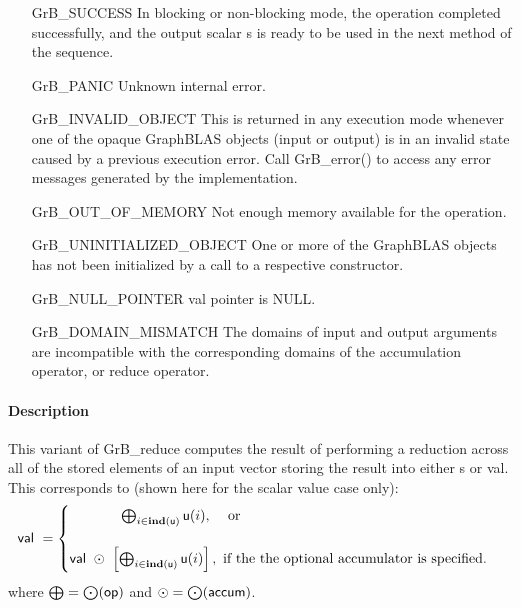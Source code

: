 \begin{itemize}[leftmargin=2.1in]
    \item[{\sf GrB\_SUCCESS}]         In blocking or non-blocking mode, 
    the operation completed successfully, and the
    output scalar {\sf s} is ready to be used in the next method of 
    the sequence.

    \item[{\sf GrB\_PANIC}]           Unknown internal error.

    \item[{\sf GrB\_INVALID\_OBJECT}] This is returned in any execution mode 
    whenever one of the opaque GraphBLAS objects (input or output) is in an invalid 
    state caused by a previous execution error.  Call {\sf GrB\_error()} to access 
    any error messages generated by the implementation.

    \item[{\sf GrB\_OUT\_OF\_MEMORY}] Not enough memory available for the operation.

    \item[{\sf GrB\_UNINITIALIZED\_OBJECT}] One or more of the GraphBLAS objects 
    has not been initialized by a call to a respective constructor.

    \item[{\sf GrB\_NULL\_POINTER}]  {\sf val} pointer is {\sf NULL}.
    
    \item[{\sf GrB\_DOMAIN\_MISMATCH}]    The domains of input and output arguments are
    incompatible with the corresponding domains of the accumulation operator, 
    or reduce operator.
\end{itemize}

\paragraph{Description}

This variant of {\sf GrB\_reduce} computes the result of performing a reduction
across all of the stored elements of an input vector storing the result into either
{\sf s} or {\sf val}.  This corresponds to (shown here for the scalar value case only):
\begin{equation*}
{\sf val} ~ = 
  \begin{cases}
     \hspace{3.7em} \bigoplus_{i \in \mathbf{ind}({\sf u})} {\sf u}(i) \text{,~~~ or} \\& \\
    {\sf val} ~\odot~ \left[ \bigoplus_{i \in \mathbf{ind}({\sf u})} {\sf u}(i)\right], \text{~if the the optional accumulator is specified.} 
  \end{cases}
\end{equation*}
where $\bigoplus = \bigodot({\sf op})$ and $\odot = \bigodot({\sf accum})$.  

